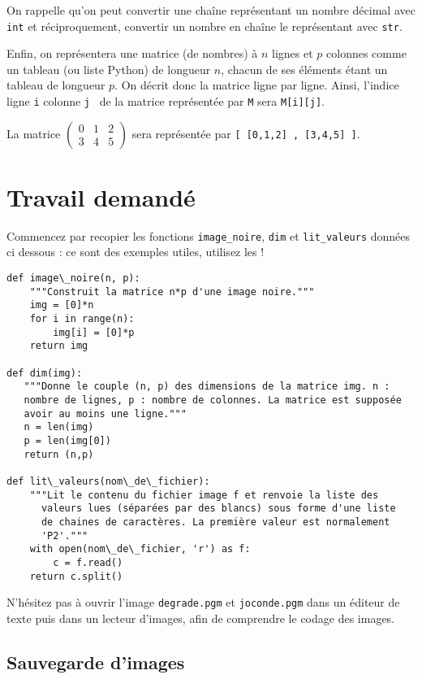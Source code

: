 On rappelle qu'on peut convertir une chaîne représentant un nombre
décimal avec \texttt{int} et réciproquement, convertir un nombre en chaîne
le représentant avec \texttt{str}.


Enfin, on représentera une matrice (de nombres) à $n$ lignes et $p$ colonnes comme un tableau (ou liste Python) de longueur $n$, chacun de ses éléments étant un tableau de longueur $p$. On décrit donc la matrice ligne par ligne. 
Ainsi, l'indice \og ligne \texttt{i} colonne \texttt{j} \fg\ de la matrice représentée par \texttt{M} sera \texttt{M[i][j]}.
\begin{exemple}
  La matrice $\begin{pmatrix} 0&1&2 \\ 3&4&5 \end{pmatrix}$ sera représentée par \texttt{[ [0,1,2] , [3,4,5] ]}.
\end{exemple}

\section*{Travail demandé}

Commencez par recopier les fonctions  \texttt{image\_noire}, \texttt{dim} et  \texttt{lit\_valeurs} données ci dessous : ce sont des exemples utiles, utilisez les ! 

\begin{lstlisting}
def image\_noire(n, p):
    """Construit la matrice n*p d'une image noire."""
    img = [0]*n
    for i in range(n):
        img[i] = [0]*p
    return img
    
def dim(img):
   """Donne le couple (n, p) des dimensions de la matrice img. n :
   nombre de lignes, p : nombre de colonnes. La matrice est supposée
   avoir au moins une ligne."""
   n = len(img)
   p = len(img[0])
   return (n,p)
   
def lit\_valeurs(nom\_de\_fichier):
    """Lit le contenu du fichier image f et renvoie la liste des
      valeurs lues (séparées par des blancs) sous forme d'une liste
      de chaines de caractères. La première valeur est normalement
      'P2'."""
    with open(nom\_de\_fichier, 'r') as f:
        c = f.read()
    return c.split()
\end{lstlisting}


N'hésitez pas à ouvrir l'image \texttt{degrade.pgm} et \texttt{joconde.pgm} dans un éditeur de texte puis dans un lecteur d'images, afin de comprendre le codage des images.


\subsection*{Sauvegarde d'images}

